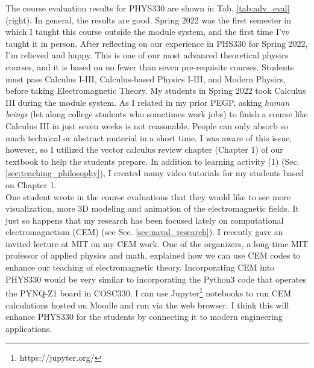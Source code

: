 \documentclass[../../main.tex]{subfiles}
\begin{document}
The course evaluation results for PHYS330 are shown in Tab. \ref{tab:adv_eval} (right).  In general, the results are good.  Spring 2022 was the first semester in which I taught this course outside the module system, and the first time I've taught it in person.  After reflecting on our experience in PHS330 for Spring 2022, I'm relieved and happy.  This is one of our most advanced theoretical physics courses, and it is based on no fewer than seven pre-requisite courses.  Students must pass Calculus I-III, Calculus-based Physics I-III, and Modern Physics, before taking Electromagnetic Theory.  My students in Spring 2022 took Calculus III during the module system.  As I related in my prior PEGP, asking \textit{human beings} (let along college students who sometimes work jobs) to finish a course like Calculus III in just seven weeks is not reasonable.  People can only absorb so much technical or abstract material in a short time.  I was aware of this issue, however, so I utilized the vector calculus review chapter (Chapter 1) of our textbook to help the students prepare.  In addition to learning activity (1) (Sec. \ref{sec:teaching_philosophy}), I created many video tutorials for my students based on Chapter 1.
\\
\vspace{0.15cm}
One student wrote in the course evaluations that they would like to see more visualization, more 3D modeling and animation of the electromagnetic fields.  It just so happens that my research has been focused lately on computational electromagnetism (CEM) (see Sec. \ref{sec:naval_research}).  I recently gave an invited lecture at MIT on my CEM work.  One of the organizers, a long-time MIT professor of applied physics and math, explained how we can use CEM codes to enhance our teaching of electromagnetic theory.  Incorporating CEM into PHYS330 would be very similar to incorporating the Python3 code that operates the PYNQ-Z1 board in COSC330.  I can use Jupyter\footnote{https://jupyter.org/} notebooks to run CEM calculations hosted on Moodle and run via the web browser.  I think this will enhance PHYS330 for the students by connecting it to modern engineering applications.
\end{document}
